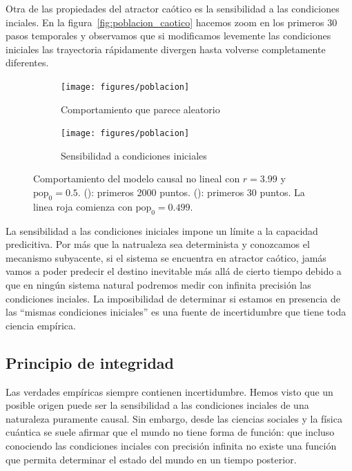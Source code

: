 \documentclass[a4paper,10pt]{book}
\theoremstyle{definition}
\begin{document}

Otra de las propiedades del atractor caótico es la sensibilidad a las condiciones inciales.
%
En la figura~\ref{fig:poblacion_caotico} hacemos zoom en los primeros 30 pasos temporales y observamos que si modificamos levemente las condiciones iniciales las trayectoria rápidamente divergen hasta volverse completamente diferentes.

%

\begin{figure}[ht!]
    \centering
    \begin{subfigure}[b]{0.4\textwidth}
    \centering
    \texttt{[image: figures/poblacion]}
    \caption{Comportamiento que parece aleatorio}
    \label{fig:pseudo_aleatorio}
    \end{subfigure}
    \begin{subfigure}[b]{0.4\textwidth}
    \centering
    \texttt{[image: figures/poblacion]}
    \caption{Sensibilidad a condiciones iniciales}
    \label{fig:sensibilidad}
    \end{subfigure}
    \caption{Comportamiento del modelo causal no lineal con $r=3.99$ y $\text{pop}_0 = 0.5$.
    (): primeros 2000 puntos.
    (): primeros 30 puntos. La linea roja comienza con $\text{pop}_0 = 0.499$.}
    \label{fig:propiedades_caoticas}
\end{figure}

%

La sensibilidad a las condiciones iniciales impone un límite a la capacidad predicitiva.
%
Por más que la natrualeza sea determinista y conozcamos el mecanismo subyacente, si el sistema se encuentra en atractor caótico, jamás vamos a poder predecir el destino inevitable más allá de cierto tiempo debido a que en ningún sistema natural podremos medir con infinita precisión las condiciones inciales.
%
La imposibilidad de determinar si estamos en presencia de las ``mismas condiciones iniciales'' es una fuente de incertidumbre que tiene toda ciencia empírica.

\subsection{Principio de integridad}\label{sec:principio_integridad}

Las verdades empíricas siempre contienen incertidumbre.
%
Hemos visto que un posible origen puede ser la sensibilidad a las condiciones inciales de una naturaleza puramente causal.
%
Sin embargo, desde las ciencias sociales y la física cuántica se suele afirmar que el mundo no tiene forma de función: que incluso conociendo las condiciones inciales con precisión infinita no existe una función que permita determinar el estado del mundo en un tiempo posterior.
\end{document}
